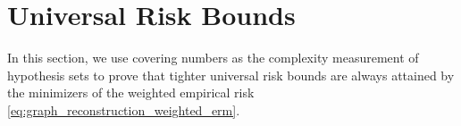 \documentclass[letterpaper]{article} %
\newcommand{\weight}{\mathbf{w}}
\newcommand{\normo}[1]{\|#1\|_1}
\newcommand{\red}[1]{\textcolor{red}{#1}}
\newcommand{\todo}[1]{\red{\textsc{todo:} #1}}
\newcommand{\citet}[1]{\citeauthor{#1}\ (\citeyear{#1})}
\newcommand{\citep}[3]{(#1\ \citeauthor{#3}\ \citeyear{#3},\ #2)}
\begin{document}








\section{Universal Risk Bounds} %
\label{sec:risk_bounds}
In this section, we use covering numbers as the complexity measurement of hypothesis sets to prove that tighter universal risk bounds are always attained by the minimizers of the weighted empirical risk \eqref{eq:graph_reconstruction_weighted_erm}.
\end{document}
